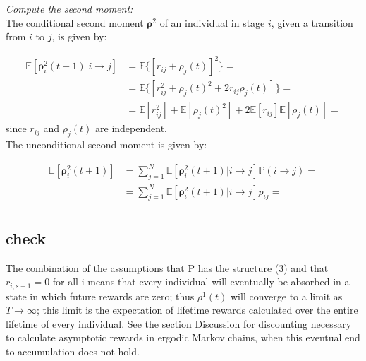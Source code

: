 \documentclass[\main/main.tex]{subfiles}
\begin{document}
\noindent \textit{Compute the second moment:}\\
\noindent The conditional second moment $\bm{\rho}^2$ of an individual in stage $i$, given a transition from $i$ to $j$, is given by: 

\begin{equation}
\begin{split}
    \mathds{E} [\bm{\rho}_i^2 (t+1) | i \rightarrow j ] &= \mathds{E} \big\{ [ r_{ij} + \rho_j(t)]^2 \big\} =\\
    &= \mathds{E} \big\{ [ r_{ij}^2 + \rho_j(t)^2 + 2 r_{ij} \rho_j(t)] \big\} =\\
     &= \mathds{E} [ r_{ij}^2] +\mathds{E} [ \rho_j(t)^2] + 2 \mathds{E} [r_{ij}] \mathds{E} [\rho_j(t)]  =
\end{split}
\end{equation}
since $r_{ij}$ and $\rho_j(t)$ are independent.\\

\noindent The unconditional second moment is given by: 

\begin{equation}
\begin{split}
\mathds{E} [\bm{\rho}_i^2 (t+1)] &= \sum_{j=1}^N \mathds{E} [\bm{\rho}_i^2 (t+1) | i \rightarrow j ] \mathds{P}(i\rightarrow j) =\\
&= \sum_{j=1}^N \mathds{E} [\bm{\rho}_i^2 (t+1) | i \rightarrow j ] p_{ij} =\\
\end{split}
\end{equation}

\subsection{\color{red}check}
The combination of the assumptions that P has the structure (3) and that $r_{i,s+1} =0$  for all i means that every individual will eventually be absorbed in a state in which future rewards are zero; thus $\rho^1(t)$ will converge to a limit as $T\rightarrow \infty$; this limit is the expectation of lifetime rewards calculated over the entire lifetime of every individual. See the section Discussion for discounting necessary to calculate asymptotic rewards in ergodic Markov chains, when this eventual end to accumulation does not hold. \citep{Caswell2018}
\end{document}
